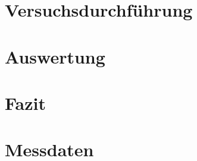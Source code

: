 \documentclass[
    oneside, 
    footinclude=off, 
    captions=tableheading, 
    DIV=12;usenames,
    dvipsnames
]{scrartcl}
\begin{document}
\newpage
\section{Versuchsdurchführung}
    

\newpage
\section{Auswertung}
    

\newpage
\section{Fazit}
    


\newpage
    
\newpage
    \listoffigures
    \listoftables


\newpage
    \section*{Messdaten}
    
\newpage
    


%
\end{document}
